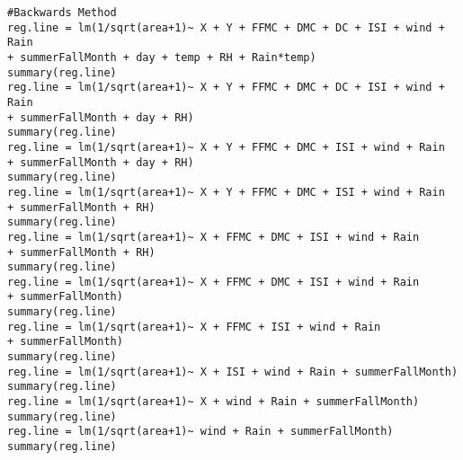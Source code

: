 \documentclass[11pt]{report}
\begin{document}
\begin{verbatim}
#Backwards Method
reg.line = lm(1/sqrt(area+1)~ X + Y + FFMC + DMC + DC + ISI + wind + Rain 
+ summerFallMonth + day + temp + RH + Rain*temp)
summary(reg.line)
reg.line = lm(1/sqrt(area+1)~ X + Y + FFMC + DMC + DC + ISI + wind + Rain 
+ summerFallMonth + day + RH)
summary(reg.line)
reg.line = lm(1/sqrt(area+1)~ X + Y + FFMC + DMC + ISI + wind + Rain 
+ summerFallMonth + day + RH)
summary(reg.line)
reg.line = lm(1/sqrt(area+1)~ X + Y + FFMC + DMC + ISI + wind + Rain 
+ summerFallMonth + RH)
summary(reg.line)
reg.line = lm(1/sqrt(area+1)~ X + FFMC + DMC + ISI + wind + Rain 
+ summerFallMonth + RH)
summary(reg.line)
reg.line = lm(1/sqrt(area+1)~ X + FFMC + DMC + ISI + wind + Rain 
+ summerFallMonth)
summary(reg.line)
reg.line = lm(1/sqrt(area+1)~ X + FFMC + ISI + wind + Rain 
+ summerFallMonth)
summary(reg.line)
reg.line = lm(1/sqrt(area+1)~ X + ISI + wind + Rain + summerFallMonth)
summary(reg.line)
reg.line = lm(1/sqrt(area+1)~ X + wind + Rain + summerFallMonth)
summary(reg.line)
reg.line = lm(1/sqrt(area+1)~ wind + Rain + summerFallMonth)
summary(reg.line)

\end{verbatim}
\end{document}
